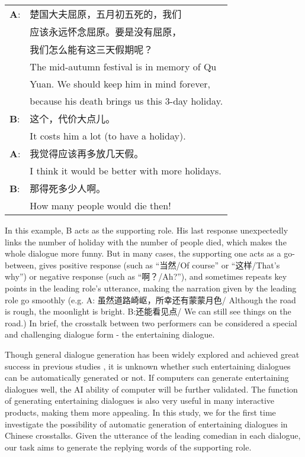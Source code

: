 \documentclass[letterpaper]{article} %
\begin{document}
\begin{CJK*}{UTF8}{gbsn}
\begin{tabular}{ll}
	\textbf{A}: & 楚国大夫屈原，五月初五死的，我们\\
	&	应该永远怀念屈原。要是没有屈原，\\
	&	我们怎么能有这三天假期呢？ \\
	&	The mid-autumn festival is in memory of Qu \\
	&	Yuan. We should keep him in mind forever, \\
	&	because his death brings us this 3-day holiday.\\
	\textbf{B}: & 这个，代价大点儿。\\
	&	It costs him a lot (to have a holiday).\\
	\textbf{A}: & 我觉得应该再多放几天假。\\
	&	I think it would be better with more holidays.\\
	\textbf{B}: & 那得死多少人啊。\\
	&	How many people would die then!\\
\end{tabular}
In this example, B acts as the supporting role. His last response unexpectedly links the number of holiday with the number of people died, which makes the whole dialogue more funny.
But in many cases, the supporting one acts as a go-between, gives positive response (such as ``当然/Of course'' or ``这样/That's why'') or negative response (such as ``啊？/Ah?''), and sometimes repeats key points in the leading role's utterance, making the narration given by the leading role go smoothly (e.g. A: 虽然道路崎岖，所幸还有蒙蒙月色/ Although the road is rough, the moonlight is bright. B:还能看见点/ We can still see things on the road.) In brief, the crosstalk between two performers can be considered a special and challenging dialogue form - the entertaining dialogue.      

Though general dialogue generation has been widely explored and achieved great success in previous studies \cite{li-EtAl:2016:EMNLP20162,sordoni-EtAl:2015:NAACL-HLT,ritter2011data}, %
it is unknown whether such entertaining dialogues can be automatically generated or not. If computers can generate entertaining dialogues well, the AI ability of computer will be further validated. The function of generating entertaining dialogues is also very useful in many interactive products, making them more appealing. In this study, we for the first time investigate the possibility of automatic generation of entertaining dialogues in Chinese crosstalks. Given the utterance of the leading comedian in each dialogue, our task aims to generate the replying words of the supporting role. 


\end{CJK*}
\end{document}
